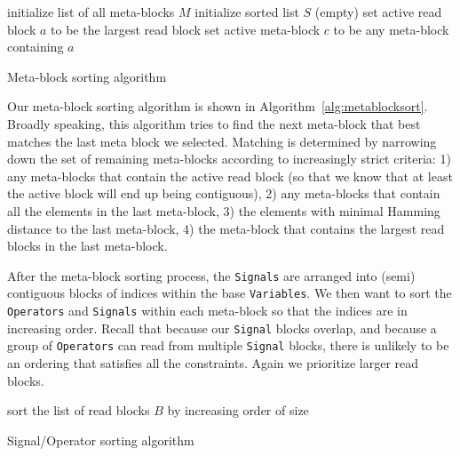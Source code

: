 \documentclass{article}
\begin{document}
\begin{algorithm}
\DontPrintSemicolon
initialize list of all meta-blocks $M$\;
initialize sorted list $S$ (empty)\;
set active read block $a$ to be the largest read block\;
set active meta-block $c$ to be any meta-block containing $a$\;
\caption{Meta-block sorting algorithm}
\label{alg:metablocksort}
\end{algorithm}

Our meta-block sorting algorithm is shown in Algorithm~\ref{alg:metablocksort}.  Broadly speaking, this algorithm tries to find the next meta-block that best matches the last meta block we selected.  Matching is determined by narrowing down the set of remaining meta-blocks according to increasingly strict criteria: 1) any meta-blocks that contain the active read block (so that we know that at least the active block will end up being contiguous), 2) any meta-blocks that contain all the elements in the last meta-block, 3) the elements with minimal Hamming distance to the last meta-block, 4) the meta-block that contains the largest read blocks in the last meta-block.

After the meta-block sorting process, the \texttt{Signals} are arranged into (semi) contiguous blocks of indices within the base \texttt{Variables}.  We then want to sort the \texttt{Operators} and \texttt{Signals} within each meta-block so that the indices are in increasing order.  Recall that because our \texttt{Signal} blocks overlap, and because a group of \texttt{Operators} can read from multiple \texttt{Signal} blocks, there is unlikely to be an ordering that satisfies all the constraints.  Again we prioritize larger read blocks.

\begin{algorithm}
\DontPrintSemicolon
sort the list of read blocks $B$ by increasing order of size\;
\caption{Signal/Operator sorting algorithm}
\label{alg:sigopsort}
\end{algorithm}
\end{document}
